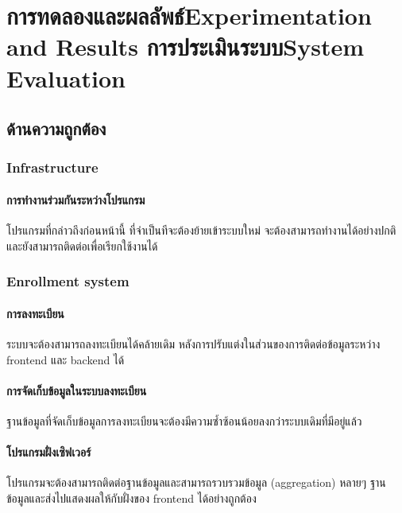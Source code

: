 \chapter{\ifproject%
\ifcpe การทดลองและผลลัพธ์\else Experimentation and Results\fi
\else%
\ifcpe การประเมินระบบ\else System Evaluation\fi
\fi}

\section{ด้านความถูกต้อง}

\subsection{Infrastructure}

\subsubsection{การทำงานร่วมกันระหว่างโปรแกรม}

โปรแกรมที่กล่าวถึงก่อนหน้านี้ ที่จำเป็นทีจะต้องย้ายเข้าระบบใหม่ จะต้องสามารถทำงานได้อย่างปกติ และยังสามารถติดต่อเพื่อเรียกใช้งานได้

\subsection{Enrollment system}

\subsubsection{การลงทะเบียน}

ระบบจะต้องสามารถลงทะเบียนได้คล้ายเดิม หลังการปรับแต่งในส่วนของการติดต่อข้อมูลระหว่าง frontend และ backend ได้

\subsubsection{การจัดเก็บข้อมูลในระบบลงทะเบียน}

ฐานข้อมูลที่จัดเก็บข้อมูลการลงทะเบียนจะต้องมีความซ้ำซ้อนน้อยลงกว่าระบบเดิมที่มีอยู่แล้ว

\subsubsection{โปรแกรมฝั่งเซิฟเวอร์}

โปรแกรมจะต้องสามารถติดต่อฐานข้อมูลและสามารถรวบรวมข้อมูล (aggregation) หลายๆ ฐานข้อมูลและส่งไปแสดงผลให้กับฝั่งของ frontend ได้อย่างถูกต้อง

